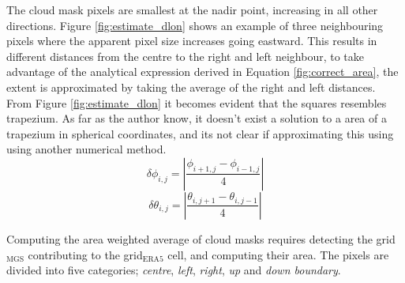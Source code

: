 
The cloud mask pixels are smallest at the nadir point, increasing in all other directions. Figure \ref{fig:estimate_dlon} shows an example of three neighbouring pixels where the apparent pixel size increases going eastward. This results in different distances from the centre to the right and left neighbour, to take advantage of the analytical expression derived in Equation \ref{fig:correct_area}, the extent is approximated by taking the average of the right and left distances. From Figure \ref{fig:estimate_dlon} it becomes evident that the squares resembles trapezium. As far as the author know, it doesn't exist a solution to a area of a trapezium in spherical coordinates, and its not clear if approximating this using using another numerical method.
\begin{equation} \label{eq:app_lon}
    \delta \phi_{i,j} = \left| \frac{\phi_{i+1,j} - \phi_{i-1, j}}{4} \right|
\end{equation}
\begin{equation} \label{eq:app_lat}
    \delta \theta_{i,j} = \left| \frac{\theta_{i,j+1} - \theta_{i, j-1}}{4} \right|
\end{equation}


Computing the area weighted average of cloud masks requires detecting the grid$_{\text{MGS}}$ contributing to the grid$_{\text{ERA5}}$ cell, and computing their area. The pixels are divided into five categories; \textit{centre}, \textit{left}, \textit{right}, \textit{up} and \textit{down boundary}. 

